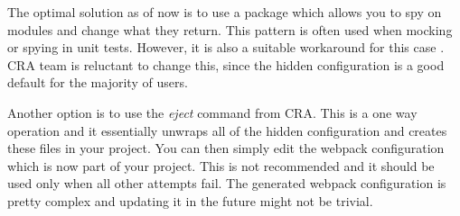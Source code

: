 The optimal solution as of now is to use a package which allows you to spy on modules and change
what they return. This pattern is often used when mocking or spying in unit tests. However, it is
also a suitable workaround for this case \cite{cra_modify_webpack_config}. CRA team is reluctant to
change this, since the hidden configuration is a good default for the majority of users.

Another option is to use the \textit{eject} command from CRA. This is a one way operation and it
essentially unwraps all of the hidden configuration and creates these files in your project. You can
then simply edit the webpack configuration which is now part of your project. This is not
recommended and it should be used only when all other attempts fail. The generated webpack
configuration is pretty complex and updating it in the future might not be trivial.
